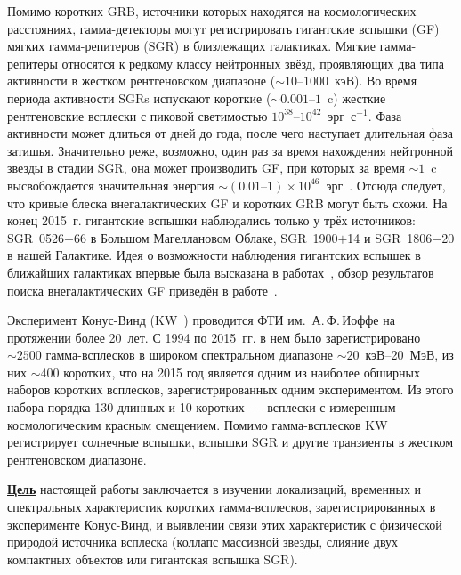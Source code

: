 Помимо коротких GRB, источники которых находятся на космологических расстояниях,
гамма-детекторы могут регистрировать гигантские вспышки (GF) мягких гамма-репитеров (SGR)
в близлежащих галактиках. Мягкие гамма-репитеры относятся 
к редкому классу нейтронных звёзд, проявляющих 
два типа активности в жестком рентгеновском диапазоне ($\sim 10\textrm{--}1000$~кэВ). 
Во время периода активности SGRs испускают короткие ($\sim0.001\textrm{--}1$~c) жесткие рентгеновские всплески 
с пиковой светимостью $10^{38}\textrm{--}10^{42}$~эрг~с$^{-1}$. Фаза активности может длиться 
от дней до года, после чего наступает длительная фаза затишья. Значительно реже, 
возможно, один раз за время нахождения нейтронной звезды в стадии SGR, она может 
производить GF, при которых за время $\sim 1$~c высвобождается значительная 
энергия $\sim(0.01\textrm{--}1)\times 10^{46}$~эрг~\citep{Mereghetti2013}.
Отсюда следует, что кривые блеска внегалактических GF и коротких GRB могут быть схожи. 
На конец 2015~г. гигантские вспышки наблюдались только у трёх источников: 
SGR~0526$-$66 в Большом Магеллановом Облаке, SGR~1900$+$14 и SGR~1806$-$20 в нашей Галактике.
Идея о возможности наблюдения гигантских вспышек в ближайших галактиках впервые была высказана 
в работах~\citep{Mazets1981}, обзор результатов поиска 
внегалактических GF приведён в работе~\citep{Hurley2011}.

Эксперимент Конус-Винд (KW~\citep{Aptekar_1995SSR}) проводится ФТИ им.~А.\,Ф.\,Иоффе 
на протяжении более 20~лет. С 1994 по 2015~гг. в нем  было зарегистрировано 
$\sim 2500$ гамма-всплесков в широком спектральном диапазоне $\sim 20$~кэВ--20~МэВ,
из них $\sim 400$ коротких, что на 2015 год является 
одним из наиболее обширных наборов коротких всплесков, зарегистрированных 
одним экспериментом. Из этого набора порядка 130 длинных и 10 коротких~--- всплески 
с измеренным космологическим красным смещением. 
Помимо гамма-всплесков KW регистрирует солнечные вспышки, вспышки SGR 
и другие транзиенты в жестком рентгеновском диапазоне.

\underline{\textbf{Цель}} настоящей работы заключается в изучении локализаций, 
временных и спектральных характеристик коротких гамма-всплесков, 
зарегистрированных в эксперименте Конус-Винд, и выявлении 
связи этих характеристик с физической природой источника всплеска 
(коллапс массивной звезды, слияние двух компактных объектов или гигантская вспышка SGR).


